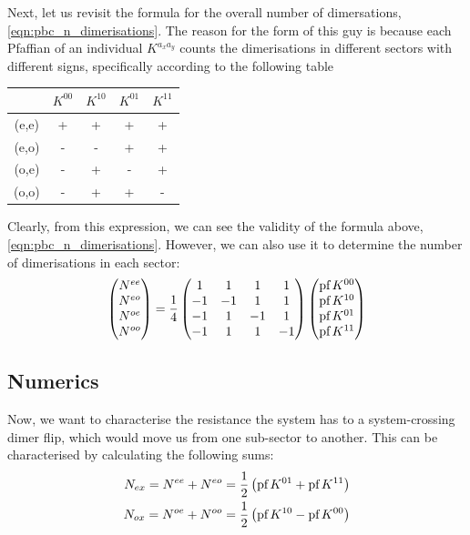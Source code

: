 \documentclass[11pt, oneside]{article} %
\numberwithin{equation}{section}
\begin{document}
Next, let us revisit the formula for the overall number of dimersations, \cref{eqn:pbc_n_dimerisations}. The reason for the form of this guy is because each Pfaffian of an individual $K^{a_x a_y}$ counts the dimerisations in different sectors with different signs, specifically according to the following table
\begin{center}
\begin{tabular}{ c|c c c c }
    & $K^{00}$& $K^{10}$& $K^{01}$& $K^{11}$\\
    \hline
    (e,e) & + & +& +& + \\ 
    (e,o) & - & -& +& + \\  
    (o,e) & - & +& -& + \\
    (o,o) & - & +& +& -    
\end{tabular}
\end{center}
Clearly, from this expression, we can see the validity of the formula above, \cref{eqn:pbc_n_dimerisations}. However, we can also use it to determine the number of dimerisations in each sector:
\begin{align}
    \begin{pmatrix}
        N^{ee} \\
        N^{eo} \\
        N^{oe} \\
        N^{oo} 
    \end{pmatrix} = \frac 14\begin{pmatrix}
        1&1&1&1 \\ 
        -1&-1&1&1 \\ 
        -1&1&-1&1 \\ 
        -1&1&1&-1 
    \end{pmatrix}\begin{pmatrix}
        \textup{pf}\, K^{00}\\
        \textup{pf}\, K^{10}\\
        \textup{pf}\, K^{01}\\
        \textup{pf}\, K^{11}
    \end{pmatrix}
\end{align}



\subsection{Numerics}
Now, we want to characterise the resistance the system has to a system-crossing dimer flip, which would move us from one sub-sector to another. This can be characterised by calculating the following sums:
\begin{align}
    N_{ex} =N^{ee} + N^{eo} =\frac 12 \left (\textup{pf}\, K^{01} + \textup{pf}\, K^{11}\right ) \\ 
    N_{ox} =N^{oe} + N^{oo} =\frac 12 \left (  \textup{pf}\, K^{10} - \textup{pf}\, K^{00} \right ) 
\end{align}
\end{document}
